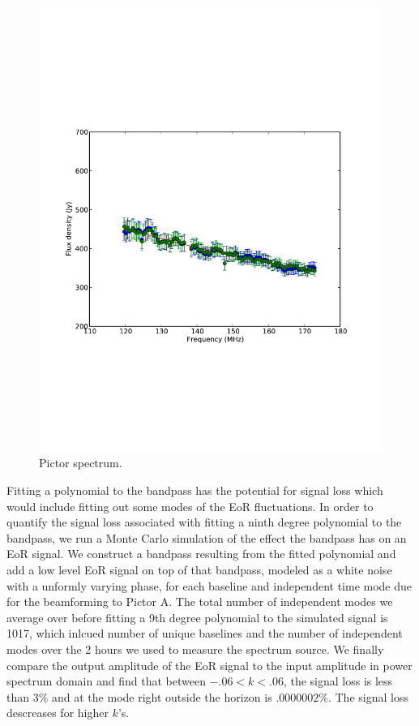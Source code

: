 \documentclass[twocolumn,numberedappendix]{emulateapj} \shorttitle{PSA64}
\begin{document}
\begin{figure}[!t]
\centering
\includegraphics[width=\columnwidth]{plots/PicA_normalized_spectrum.pdf}
\caption{Pictor spectrum.}
\label{fig:pic_spec}
\end{figure}

Fitting a polynomial to the bandpass has the potential for signal loss which
would include fitting out some modes of the EoR fluctuations. In order to
quantify the signal loss associated with fitting a ninth degree polynomial to
the bandpass, we run a Monte Carlo simulation of the effect the bandpass has on
an EoR signal. We construct a bandpass resulting from the fitted
polynomial and add a low level EoR signal on top of that bandpass, modeled as a
white noise with a unformly varying phase, for each baseline and independent
time mode due for the beamforming to Pictor A. The total number of independent
modes we average over before fitting a 9th degree polynomial to the simulated
signal is 1017, which inlcued number of unique baselines and the number of
independent modes over the 2 hours we used to measure the spectrum source. We
finally compare the output amplitude of the EoR signal to the input amplitude in
power spectrum domain and find that between $-.06 < k < .06$, the signal loss is
less than $3\%$ and at the mode right outside the horizon is $.0000002\%$. The
signal loss descreases for higher $k$'s.
\end{document}
